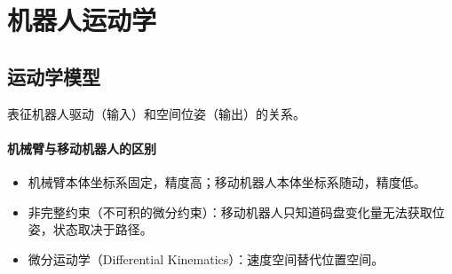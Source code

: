 \documentclass[
12pt, %
a4paper, 
oneside, %
headinclude,footinclude, %
]{scrartcl}
\begin{document}
\begin{comment}
\subsection[轮式机器人]{轮式机器人}
\paragraph{研究意义}
\begin{itemize}
\item 人造环境下高效：滚动摩擦，无重心起伏。
\item 结构简单，可靠性高，成本低。
\item 控制简单，系统复杂度低。
\end{itemize}
\paragraph{轮数对稳定性的影响}
轮数增加，由动态稳定向静态稳定过度。
\begin{itemize}
\item 动态稳定：执行器停止工作摔倒。倒立摆模型。    
\item 静态稳定：执行器停止工作不摔倒。陀螺效应，随动轮效应。
\end{itemize}
\end{comment}
\section{机器人运动学}
\subsection[运动学模型]{运动学模型}
表征机器人驱动（输入）和空间位姿（输出）的关系。
\paragraph{机械臂与移动机器人的区别}
\begin{itemize}
\item 机械臂本体坐标系固定，精度高；移动机器人本体坐标系随动，精度低。
\item 非完整约束（不可积的微分约束）：移动机器人只知道码盘变化量无法获取位姿，状态取决于路径。
\item 微分运动学（Differential Kinematics）：速度空间替代位置空间。
\end{itemize}
\end{document}
